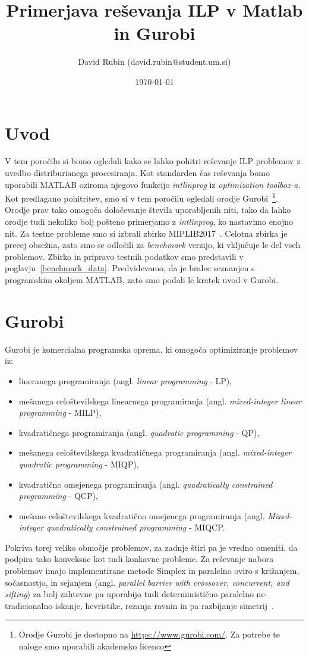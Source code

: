 \documentclass[a4paper,11pt]{article}
\title{Primerjava reševanja ILP v Matlab in Gurobi}
\author{David Rubin (david.rubin@student.um.si)}
\date{\today}
\begin{document}
\maketitle

\section{Uvod}

V tem poročilu si bomo ogledali kako se lahko pohitri reševanje ILP problemov z uvedbo distriburianega procesiranja. Kot standarden čas reševanja bomo uporabili MATLAB oziroma njegovo funkcijo \textit{intlinprog} iz \textit{optimization toolbox-a}.  Kot predlagano pohitritev, smo si v tem poročilu ogledali orodje Gurobi~\footnote{Orodje Gurobi je dostopno na \url{https://www.gurobi.com/}. Za potrebe te naloge smo uporabili akademsko licenco}. Orodje prav tako omogoča določevanje števila uporabljenih niti, tako da lahko orodje tudi nekoliko bolj pošteno primerjamo z \textit{intlinprog}, ko nastavimo enojno nit. Za testne probleme smo si izbrali zbirko MIPLIB2017~\cite{Miplib:2017}. Celotna zbirka je precej obsežna, zato smo se odločili za \textit{benchmark} verzijo, ki vključuje le del vseh problemov. Zbirko in pripravo testnih podatkov smo predstavili v poglavju~\ref{benchmark_data}. Predvidevamo, da je bralec seznanjen s programskim okoljem MATLAB, zato smo podali le kratek uvod v Gurobi.

\section{Gurobi}

Gurobi je komercialna programska oprema, ki omogoča optimiziranje problemov iz:
\begin{itemize}
\item lineranega programiranja (angl. \textit{linear programming} - LP),
\item mešanega celoštevilskega linearnega programiranja (angl. \textit{mixed-integer linear programming} - MILP),
\item kvadratičnega programiranja (angl. \textit{quadratic programming} - QP),
\item mešanega  celoštevilskega kvadratičnega programiranja (angl. \textit{mixed-integer quadratic programming} - MIQP),
\item kvadratično omejenega programiranja (angl. \textit{quadratically constrained programming} - QCP),
\item mešano celoštevilskega kvadratično omejenega programiranja (angl. \textit{Mixed-integer quadratically constrained programming} - MIQCP.
\end{itemize}
Pokriva torej veliko območje problemov, za zadnje štiri pa je vredno omeniti, da podpira tako konveksne kot tudi konkavne probleme. Za reševanje nabora problemov imajo implementirane metode Simplex in paralelno oviro s križanjem, sočasnostjo, in sejanjem (angl. \textit{parallel barrier with crossover, concurrent, and sifting}) za bolj zahtevne pa uporabijo tudi deterministično paralelno ne-tradicionalno iskanje, hevristike, rezanja ravnin in pa razbijanje simetrij~\cite{GurobiOptimizer:2020}. 	
\end{document}
